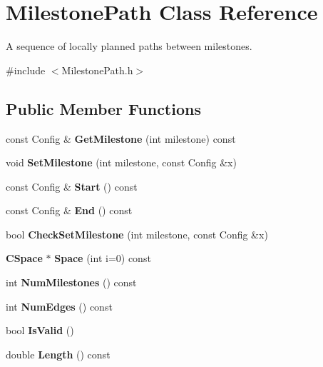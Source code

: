 \section{Milestone\+Path Class Reference}
\label{classMilestonePath}


A sequence of locally planned paths between milestones.  




{\ttfamily \#include $<$Milestone\+Path.\+h$>$}

\subsection*{Public Member Functions}
\begin{DoxyCompactItemize}
\item 
const Config \& {\bfseries Get\+Milestone} (int milestone) const \label{classMilestonePath_ad6f6f1d1724721b51dd6e4f0e7536215}

\item 
void {\bfseries Set\+Milestone} (int milestone, const Config \&x)\label{classMilestonePath_ab645aac112a001ff7c6f7b331904d6db}

\item 
const Config \& {\bfseries Start} () const \label{classMilestonePath_ad0fcff61f4a50813435349f71a3ccd70}

\item 
const Config \& {\bfseries End} () const \label{classMilestonePath_a0eb4b13b193b60cebe628b113f337173}

\item 
bool {\bf Check\+Set\+Milestone} (int milestone, const Config \&x)
\item 
{\bf C\+Space} $\ast$ {\bfseries Space} (int i=0) const \label{classMilestonePath_aba8f02fd1d95da6cc748523d874680fe}

\item 
int {\bfseries Num\+Milestones} () const \label{classMilestonePath_a4733a8904b3f991d7a84d6a27396a7c7}

\item 
int {\bfseries Num\+Edges} () const \label{classMilestonePath_abe9af85c5270ab5191d7a1019fcf45c1}

\item 
bool {\bfseries Is\+Valid} ()\label{classMilestonePath_ae5b436d6ce379bad4ad930c8e41eef1c}

\item 
double {\bf Length} () const \label{classMilestonePath_a469bcb59f6ea1ad6c5c722120d4f03fa}


\end{DoxyCompactItemize}
